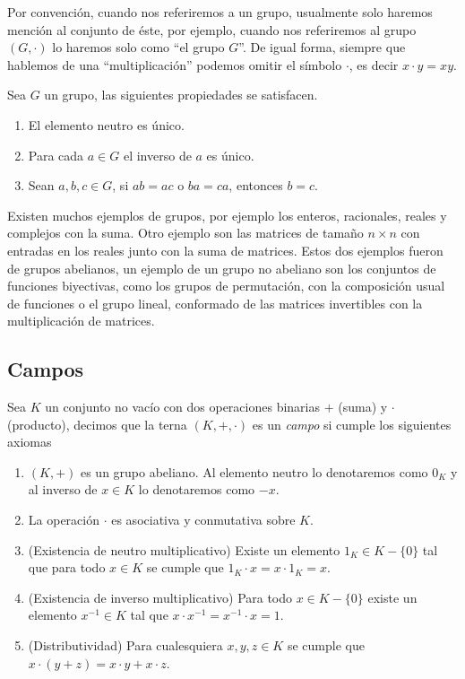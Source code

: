 Por convención, cuando nos referiremos a un grupo, usualmente solo haremos mención al conjunto de éste, por ejemplo, cuando nos referiremos al grupo $(G, \cdot)$ lo haremos solo como ``el grupo $G$''. De igual forma, siempre que hablemos de una ``multiplicación'' podemos omitir el símbolo $\cdot$, es decir $x \cdot y = xy$.

\begin{teor}
  Sea $G$ un grupo, las siguientes propiedades se satisfacen.
    \begin{enumerate}
      \item El elemento neutro es único.
      \item Para cada $a \in G$ el inverso de $a$ es único.
      \item Sean $a,b,c \in G$, si $ab=ac$ o $ba=ca$, entonces $b=c$.
    \end{enumerate}
\end{teor}

Existen muchos ejemplos de grupos, por ejemplo los enteros, racionales, reales y complejos con la suma. Otro ejemplo son las matrices de tamaño $n \times n$ con entradas en los reales junto con la suma de matrices. Estos dos ejemplos fueron de  grupos abelianos, un ejemplo de un grupo no abeliano son los conjuntos de funciones biyectivas, como los grupos de permutación, con la composición usual de funciones o el grupo lineal, conformado de las matrices invertibles con la multiplicación de matrices.

\subsection{Campos}

\begin{defi}
  Sea $K$ un conjunto no vacío con dos operaciones binarias $+$ (suma) y $\cdot$ (producto), decimos que la terna $(K, +, \cdot)$ es un \emph{campo} si cumple los siguientes axiomas
  \begin{enumerate}
    \item $(K,+)$ es un grupo abeliano. Al elemento neutro lo denotaremos como $0_K$ y al inverso de $x \in K$ lo denotaremos como $-x$.
    \item La operación $\cdot$ es asociativa y conmutativa sobre $K$.
    \item (Existencia de neutro multiplicativo) Existe un elemento $1_K \in K-\{0\}$ tal que para todo $x \in K$ se cumple que $1_K\cdot x = x\cdot 1_K = x$.
    \item (Existencia de inverso multiplicativo) Para todo $x \in K-\{0\}$ existe un elemento $ x^{-1} \in K$ tal que $x \cdot x^{-1} = x^{-1} \cdot x = 1$.
    \item (Distributividad) Para cualesquiera $x, y, z \in K$ se cumple que $x \cdot (y + z) = x \cdot y + x \cdot z$.
  \end{enumerate}
\end{defi}

